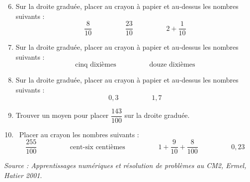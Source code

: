 \begin{activite}
            \begin{enumerate}
                \setcounter{enumi}{5}
                \item Sur la droite graduée, placer au crayon à papier et au-dessus les nombres suivants :
                $$\dfrac{8}{10} \hspace{2cm} \dfrac{23}{10} \hspace{2cm} 2+\dfrac{1}{10}$$
                \item Sur la droite graduée, placer au crayon à papier et au-dessus les nombres suivants :
                $$\text{cinq dixièmes} \hspace{2cm} \text{douze dixièmes}$$
                \item Sur la droite graduée, placer au crayon à papier et au-dessus les nombres suivants :
                $$0,3 \hspace{2cm} 1,7$$
                \item Trouver un moyen pour placer $\dfrac{143}{100}$ sur la droite graduée. \\
                \item \, Placer au crayon les nombres suivants :
                $$\dfrac{255}{100} \hspace{2cm} \text{cent-six centièmes} \hspace{2cm} 1+\dfrac{9}{10}+\dfrac{8}{100} \hspace{2cm} 0,23$$
            \end{enumerate}

    \vfill\hfill{\it\footnotesize Source : Apprentissages numériques et résolution de problèmes au CM2, Ermel, Hatier 2001}.
\end{activite}